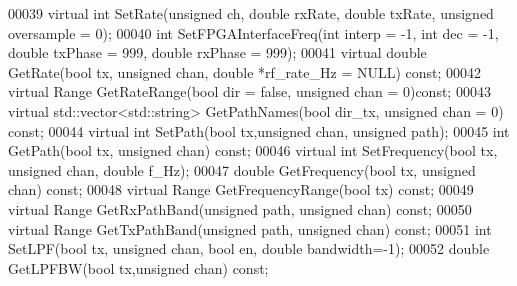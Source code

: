 \begin{DoxyCode}
00039     \textcolor{keyword}{virtual} \textcolor{keywordtype}{int} SetRate(\textcolor{keywordtype}{unsigned} ch, \textcolor{keywordtype}{double} rxRate, \textcolor{keywordtype}{double} txRate, \textcolor{keywordtype}{unsigned} 
      oversample = 0);
00040     \textcolor{keywordtype}{int} SetFPGAInterfaceFreq(\textcolor{keywordtype}{int} interp = -1, \textcolor{keywordtype}{int} dec = -1, \textcolor{keywordtype}{double} txPhase = 999, \textcolor{keywordtype}{double} rxPhase = 999);
00041     \textcolor{keyword}{virtual} \textcolor{keywordtype}{double} GetRate(\textcolor{keywordtype}{bool} tx, \textcolor{keywordtype}{unsigned} chan, \textcolor{keywordtype}{double} *rf\_rate\_Hz = NULL) \textcolor{keyword}{const};
00042     \textcolor{keyword}{virtual} Range GetRateRange(\textcolor{keywordtype}{bool} dir = \textcolor{keyword}{false}, \textcolor{keywordtype}{unsigned} chan = 0)\textcolor{keyword}{const};
00043     \textcolor{keyword}{virtual} std::vector<std::string> GetPathNames(\textcolor{keywordtype}{bool} dir_tx, \textcolor{keywordtype}{unsigned} chan = 0) \textcolor{keyword}{const};
00044     \textcolor{keyword}{virtual} \textcolor{keywordtype}{int} SetPath(\textcolor{keywordtype}{bool} tx,\textcolor{keywordtype}{unsigned} chan, \textcolor{keywordtype}{unsigned} path);
00045     \textcolor{keywordtype}{int} GetPath(\textcolor{keywordtype}{bool} tx, \textcolor{keywordtype}{unsigned} chan) \textcolor{keyword}{const};
00046     \textcolor{keyword}{virtual} \textcolor{keywordtype}{int} SetFrequency(\textcolor{keywordtype}{bool} tx, \textcolor{keywordtype}{unsigned} chan, \textcolor{keywordtype}{double} f\_Hz);
00047     \textcolor{keywordtype}{double} GetFrequency(\textcolor{keywordtype}{bool} tx, \textcolor{keywordtype}{unsigned} chan) \textcolor{keyword}{const};
00048     \textcolor{keyword}{virtual} Range GetFrequencyRange(\textcolor{keywordtype}{bool} tx) \textcolor{keyword}{const};
00049     \textcolor{keyword}{virtual} Range GetRxPathBand(\textcolor{keywordtype}{unsigned} path, \textcolor{keywordtype}{unsigned} chan) \textcolor{keyword}{const};
00050     \textcolor{keyword}{virtual} Range GetTxPathBand(\textcolor{keywordtype}{unsigned} path, \textcolor{keywordtype}{unsigned} chan) \textcolor{keyword}{const};
00051     \textcolor{keywordtype}{int} SetLPF(\textcolor{keywordtype}{bool} tx, \textcolor{keywordtype}{unsigned} chan, \textcolor{keywordtype}{bool} en, \textcolor{keywordtype}{double} bandwidth=-1);
00052     \textcolor{keywordtype}{double} GetLPFBW(\textcolor{keywordtype}{bool} tx,\textcolor{keywordtype}{unsigned} chan) \textcolor{keyword}{const};

\end{DoxyCode}
